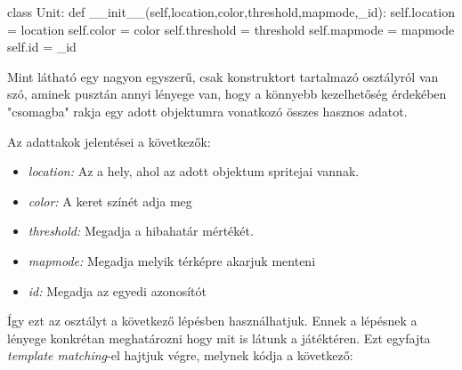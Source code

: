 \begin{python}

class Unit:
    def __init__(self,location,color,threshold,mapmode,_id):
        self.location = location
        self.color = color
        self.threshold = threshold
        self.mapmode = mapmode
        self.id = _id
\end{python}

Mint látható egy nagyon egyszerű, csak konstruktort tartalmazó osztályról van szó, aminek pusztán annyi lényege van, hogy a könnyebb kezelhetőség érdekében "csomagba" rakja egy adott objektumra vonatkozó összes hasznos adatot.

Az adattakok jelentései a következők:
\begin{itemize}
    \item \textit{location:} Az a hely, ahol az adott objektum spritejai vannak.
    \item \textit{color:} A keret színét adja meg
    \item \textit{threshold:} Megadja a hibahatár mértékét. 
    \item \textit{mapmode:} Megadja melyik térképre akarjuk menteni 
    \item \textit{id:}  Megadja az egyedi azonosítót
\end{itemize}

Így ezt az osztályt a következő lépésben használhatjuk. Ennek a lépésnek a lényege konkrétan meghatározni hogy mit is látunk a játéktéren. Ezt egyfajta \textit{template matching}-el hajtjuk végre, melynek kódja a következő:


